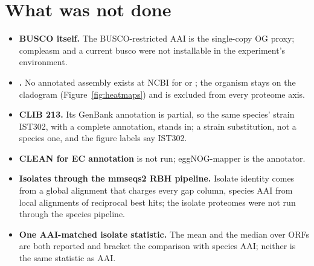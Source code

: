 
\section{What was not done}\label{sec:notdone}

\begin{itemize}
\item \textbf{BUSCO itself.} The BUSCO-restricted AAI is the single-copy OG proxy;
  compleasm and a current busco were not installable in the experiment's environment.
\item \textbf{.} No annotated assembly exists at NCBI for
   or ; the organism stays on the
  cladogram (Figure~\ref{fig:heatmaps}) and is excluded from every proteome axis.
\item \textbf{ CLIB 213.} Its GenBank annotation is partial, so the same
  species' strain IST302, with a complete annotation, stands in; a strain substitution, not
  a species one, and the figure labels say IST302.
\item \textbf{CLEAN for EC annotation} is not run; eggNOG-mapper is the annotator.
\item \textbf{Isolates through the mmseqs2 RBH pipeline.} Isolate identity comes from a
  global alignment that charges every gap column, species AAI from local alignments of
  reciprocal best hits; the isolate proteomes were not run through the species pipeline.
\item \textbf{One AAI-matched isolate statistic.} The mean and the median over ORFs are
  both reported and bracket the comparison with species AAI; neither is the same statistic
  as AAI.
\end{itemize}
